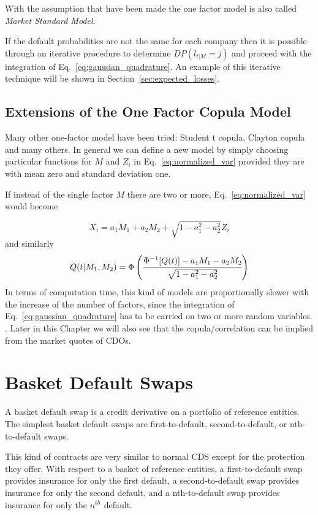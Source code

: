With the assumption that have been made the one factor model is also called \emph{Market Standard Model}.

If the default probabilities are not the same for each company then it is possible through an iterative procedure to determine $DP(l_{t|M}=j)$ and proceed with the integration of Eq.~\ref{eq:gaussian_quadrature}.
An example of this iterative technique will be shown in Section~\ref{sec:expected_losses}.

\subsection{Extensions of the One Factor Copula Model}
Many other one-factor model have been tried: Student t copula, Clayton copula and many others. In general we can define a new model by simply choosing particular functions for $M$ and $Z_i$ in Eq.~\ref{eq:normalized_var} provided they are with mean zero and standard deviation one. 

If instead of the single factor $M$ there are two or more, Eq.~\ref{eq:normalized_var} would become

\[
X_i = a_1 M_1 + a_2 M_2 + \sqrt{1 - a_1^2 - a^2_2}Z_i
\]
and similarly
\[
Q(t|M_1, M_2) = \Phi\left(\cfrac{\Phi^{-1}[Q(t)]-a_1 M_1 - a_2 M_2}{\sqrt{1 - a_1^2 - a^2_2}}\right)
\]
In terms of computation time, this kind of models are proportionally slower with the increase of the number of factors, since the integration of Eq.~\ref{eq:gaussian_quadrature} has to be carried on two or more random variables.
.
Later in this Chapter we will also see that the copula/correlation can be implied from the market quotes of CDOs.

\section{Basket Default Swaps}\label{basket-default-swaps}

A basket default swap is a credit derivative on a portfolio of reference
entities. The simplest basket default swaps are first-to-default,
second-to-default, or nth-to-default swaps. 

This kind of contracts are very similar to normal CDS except for the protection they offer.
With respect to a basket of reference entities, a first-to-default swap provides insurance for only the first default, a second-to-default swap provides insurance
for only the second default, and a nth-to-default swap provides insurance for only the $n^{th}$ default. 

